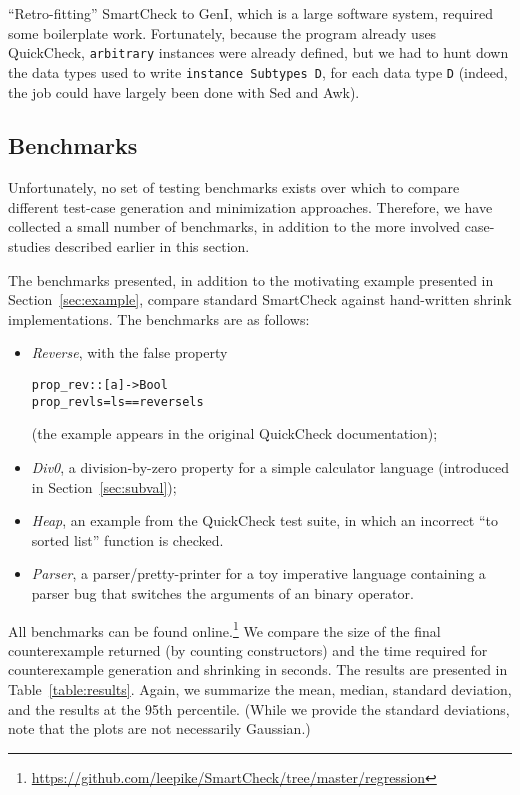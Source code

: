 \documentclass{sigplanconf}
\newenvironment{code}{\begin{alltt}\footnotesize}{\end{alltt}}
\newcommand{\ttp}[1]{\texttt{#1}}
\begin{document}
``Retro-fitting'' SmartCheck to GenI, which is a large software system, required
some boilerplate work.  Fortunately, because the program already uses
QuickCheck, \ttp{arbitrary} instances were already defined, but we had to hunt
down the data types used to write \ttp{instance Subtypes D}, for each data type
\ttp{D} (indeed, the job could have largely been done with Sed and Awk).


\subsection{Benchmarks}\label{sec:benchmarks}

Unfortunately, no set of testing benchmarks exists over which to compare
different test-case generation and minimization approaches.  Therefore, we have
collected a small number of benchmarks, in addition to the more involved
case-studies described earlier in this section.

The benchmarks presented, in addition to the motivating example presented in
Section~\ref{sec:example}, compare standard SmartCheck against hand-written
shrink implementations.  The benchmarks are as follows:

\begin{itemize}
  \item  \emph{Reverse}, with the false property
\begin{code}
prop_rev :: [a] -> Bool
prop_rev ls = ls == reverse ls
\end{code}
\noindent
(the example appears in the original QuickCheck documentation);

  \item \emph{Div0}, a division-by-zero property for a simple calculator
    language (introduced in Section~\ref{sec:subval});

  \item \emph{Heap}, an example from the QuickCheck test suite, in which an
    incorrect ``to sorted list'' function is checked.

  \item \emph{Parser}, a parser/pretty-printer for a toy imperative language
    containing a parser bug that switches the arguments of an binary operator.
\end{itemize}

\noindent
All benchmarks can be found
online.\footnote{\url{https://github.com/leepike/SmartCheck/tree/master/regression}}
We compare the size of the final counterexample returned (by counting
constructors) and the time required for counterexample generation and shrinking
in seconds.  The results are presented in Table~\ref{table:results}.  Again, we
summarize the mean, median, standard deviation, and the results at the 95th
percentile.  (While we provide the standard deviations, note that the plots are
not necessarily Gaussian.)
\end{document}
